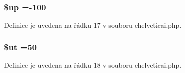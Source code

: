 \hypertarget{chelveticai_8php_a6b5ad2ac55f9df46e8f34e78fbd6f176}{
\subsubsection[{\$up}]{\setlength{\rightskip}{0pt plus 5cm}\$up =-\/100}}\label{chelveticai_8php_a6b5ad2ac55f9df46e8f34e78fbd6f176}


Definice je uvedena na řádku 17 v souboru chelveticai.\-php.

\hypertarget{chelveticai_8php_aadd3f841051043ee58e587e840e8dd0b}{
\subsubsection[{\$ut}]{\setlength{\rightskip}{0pt plus 5cm}\$ut =50}}\label{chelveticai_8php_aadd3f841051043ee58e587e840e8dd0b}


Definice je uvedena na řádku 18 v souboru chelveticai.\-php.

